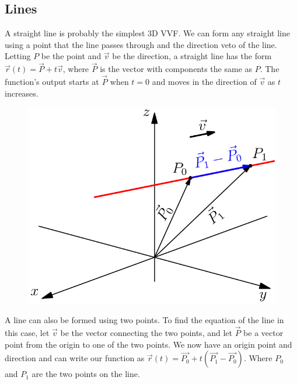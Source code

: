 \subsection{Lines}
\noindent
A straight line is probably the simplest 3D VVF. We can form any straight line using a point that the line passes through and the direction veto of the line.\\
Letting $P$ be the point and $\vec{v}$ be the direction, a straight line has the form $\vec{r}(t)=\vec{P}+t\vec{v}$, where $\vec{P}$ is the vector with components the same as $P$. The function's output starts at $\vec{P}$ when $t=0$ and moves in the direction of $\vec{v}$ as $t$ increases.

\begin{figure}[h]
	\centering
	\includegraphics[scale=0.33]{Images/vectorValuedFunctions/VectorLine}
\end{figure}

\noindent
A line can also be formed using two points. To find the equation of the line in this case, let $\vec{v}$ be the vector connecting the two points, and let $\vec{P}$ be a vector point from the origin to one of the two points. We now have an origin point and direction and can write our function as $\vec{r}(t)=\vec{P_0}+t\left(\vec{P_1}-\vec{P_0}\right)$. Where $P_0$ and $P_1$ are the two points on the line.